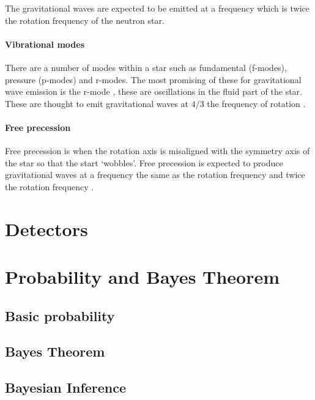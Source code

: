 The gravitational waves are expected to be emitted at a frequency which is twice the rotation frequency of the neutron star.
 
 \paragraph{Vibrational modes}
There are a number of modes within a star such as fundamental (f-modes), pressure (p-modes) and r-modes. 
The most promising of these for gravitational wave emission is the r-mode \cite{Becker2009}, these are oscillations in the fluid part of the star. 
These are thought to emit gravitational waves at $4/3$ the frequency of rotation \cite{Becker2009}.


\paragraph{Free precession}
Free precession is when the rotation axis is misaligned with the symmetry axis of the star so that the start `wobbles'. 
Free precession is expected to produce gravitational waves at a frequency the same as the rotation frequency and twice the rotation frequency \cite{Becker2009}. 


\section{Detectors}

\section{Probability and Bayes Theorem}

\subsection{Basic probability}

\subsection{Bayes Theorem}

\subsection{Bayesian Inference}

